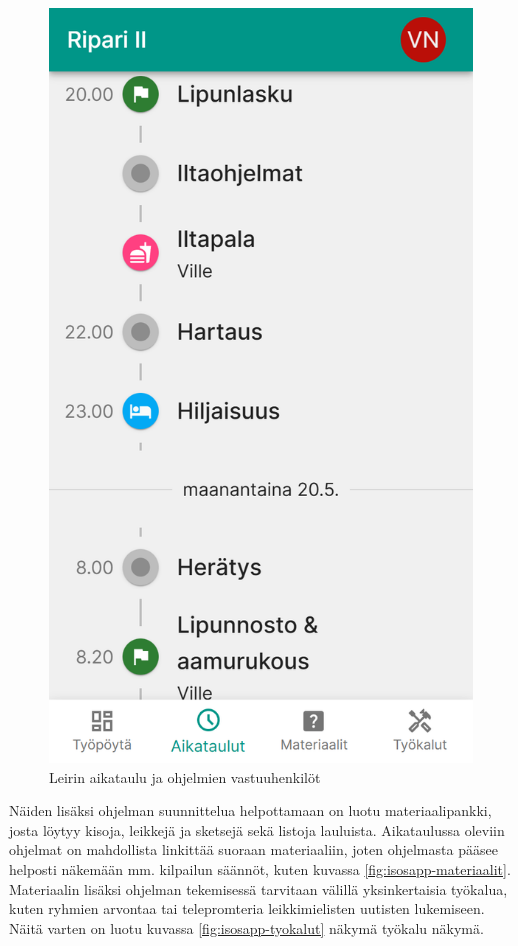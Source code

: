 \begin{figure}[h!]
\begin{minipage}[b]{.3\textwidth}
        \includegraphics[width=\textwidth]{figures/isosapp-aikataulu.png}
        \caption{Leirin aikataulu ja ohjelmien vastuuhenkilöt}
        \label{fig:isosapp-aikataulu}
    \end{minipage}
\end{figure}

Näiden lisäksi ohjelman suunnittelua helpottamaan on luotu materiaalipankki,
josta löytyy kisoja, leikkejä ja sketsejä sekä listoja lauluista. Aikataulussa
oleviin ohjelmat on mahdollista linkittää suoraan materiaaliin, joten
ohjelmasta pääsee helposti näkemään mm. kilpailun säännöt, kuten kuvassa
\ref{fig:isosapp-materiaalit}. Materiaalin lisäksi ohjelman tekemisessä
tarvitaan välillä yksinkertaisia työkalua, kuten ryhmien arvontaa tai
telepromteria leikkimielisten uutisten lukemiseen. Näitä varten on luotu
kuvassa \ref{fig:isosapp-tyokalut} näkymä työkalu näkymä.

